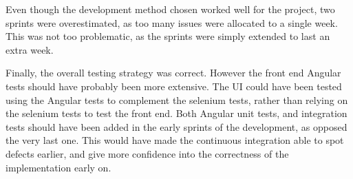 Even though the development method chosen worked well for the project, two
sprints were overestimated, as too many issues were allocated to a single week.
This was not too problematic, as the sprints were simply extended to last an extra
week.

Finally, the overall testing strategy was correct. However the front end Angular
tests should have probably been more extensive. The UI could have been tested
using the Angular tests to complement the selenium tests, rather than relying
on the selenium tests to test the front end. Both Angular unit tests, and integration
tests should have been added in the early sprints of the development, as opposed
the very last one. This would have made the continuous integration able to
spot defects earlier, and give more confidence into the correctness of the implementation
early on.


%
%
%
%
%
%
